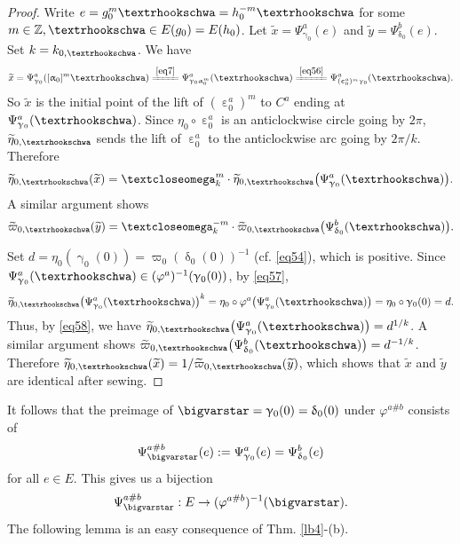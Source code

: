 \documentclass[11pt,b5paper,notitlepage]{article}
\theoremstyle{definition}
\theoremstyle{plain}
\newcommand{\wtd}{\widetilde}
\newcommand{\Zbb}{\mathbb Z}
\newcommand{\tipaomega}{\text{\textcloseomega}}
\newcommand{\tipae}{\text{\textrhookschwa}}
\numberwithin{equation}{subsection}
\begin{document}
\begin{proof}
Write $e=g_0^m\tipae=h_0^{-m}\tipae$ for some $m\in\Zbb,\tipae\in E(g_0)=E(h_0)$. Let $\wtd x=\Psi_{\upgamma_0}^a(e)$ and $\wtd y=\Psi_{\updelta_0}^b(e)$. Set $k=k_{0,\tipae}$. We have
\begin{align*}
\wtd x=\Psi_{\upgamma_0}^a([\upalpha_0]^m\tipae)\xlongequal{\eqref{eq7}}\Psi^a_{\upgamma_0\upalpha_0^m}(\tipae)\xlongequal{\eqref{eq56}}\Psi^a_{(\upepsilon_0^a)^m\upgamma_0}(\tipae).	
\end{align*}
So $\wtd x$ is the initial point of the lift of $(\upepsilon_0^a)^m$ to $C^a$ ending at $\Psi^a_{\upgamma_0}(\tipae)$. Since $\eta_0\circ\upepsilon_0^a$ is  an anticlockwise circle going by $2\pi$, $\wtd\eta_{0,\tipae}$ sends the lift of $\upepsilon_0^a$ to the anticlockwise arc going by $2\pi/k$. Therefore
\begin{align*}
\wtd\eta_{0,\tipae}(\wtd x)=\tipaomega_k^m\cdot\wtd\eta_{0,\tipae}\big(\Psi_{\upgamma_0}^a(\tipae)\big).	
\end{align*}
A similar argument shows
\begin{align*}
\wtd\varpi_{0,\tipae}(\wtd y)=\tipaomega_k^{-m}\cdot\wtd\varpi_{0,\tipae}\big(\Psi_{\updelta_0}^b(\tipae)\big).	
\end{align*}



Set $d=\eta_0(\upgamma_0(0))=\varpi_0(\updelta_0(0))^{-1}$ (cf. \eqref{eq54}), which is positive. Since $\Psi_{\upgamma_0}^a(\tipae)\in(\varphi^a)^{-1}(\upgamma_0(0))$, by \eqref{eq57},
\begin{align*}
\wtd\eta_{0,\tipae}\big(\Psi_{\upgamma_0}^a(\tipae)\big)^k=\eta_0\circ\varphi^a\big(\Psi_{\upgamma_0}^a(\tipae)\big)=\eta_0\circ\upgamma_0(0)=d.
\end{align*}
Thus, by \eqref{eq58}, we have $\wtd\eta_{0,\tipae}\big(\Psi_{\upgamma_0}^a(\tipae)\big)=d^{1/k}$. A similar argument shows $\wtd\varpi_{0,\tipae}\big(\Psi_{\updelta_0}^b(\tipae)\big)=d^{-1/k}$. Therefore $\wtd\eta_{0,\tipae}(\wtd x)=1/\wtd\varpi_{0,\tipae}(\wtd y)$, which shows that $\wtd x$ and $\wtd y$ are identical after sewing.
\end{proof}





It follows that the preimage of $\bigvarstar=\upgamma_0(0)=\updelta_0(0)$ under $\varphi^{a\#b}$ consists of 
\begin{align}
\Psi^{a\#b}_\bigvarstar(e):= \Psi_{\upgamma_0}^a(e)=\Psi_{\updelta_0}^b(e)\label{eq61}	
\end{align}
for all $e\in E$.  This gives us a bijection
\begin{align*}
\Psi_\bigvarstar^{a\#b}:E\rightarrow(\varphi^{a\#b})^{-1}(\bigvarstar).	
\end{align*}
The following lemma is an easy consequence of Thm. \ref{lb4}-(b).
\end{document}
